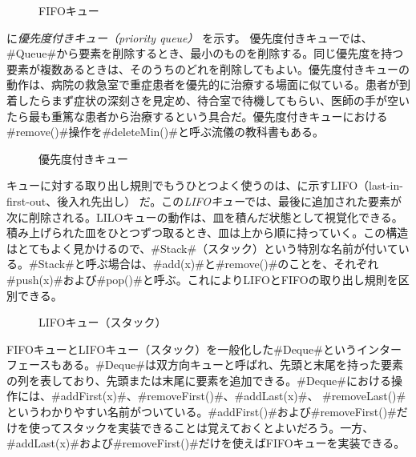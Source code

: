 \begin{figure}
  \caption{FIFOキュー}
\end{figure}

に\emph{優先度付きキュー（priority queue）}%
%
%
%
を示す。
優先度付きキューでは、#Queue#から要素を削除するとき、最小のものを削除する。同じ優先度を持つ要素が複数あるときは、そのうちのどれを削除してもよい。優先度付きキューの動作は、病院の救急室で重症患者を優先的に治療する場面に似ている。患者が到着したらまず症状の深刻さを見定め、待合室で待機してもらい、医師の手が空いたら最も重篤な患者から治療するという具合だ。優先度付きキューにおける#remove()#操作を#deleteMin()#と呼ぶ流儀の教科書もある。 %

\begin{figure}
  \caption{優先度付きキュー}
\end{figure}

キューに対する取り出し規則でもうひとつよく使うのは、に示すLIFO（last-in-first-out、後入れ先出し）
%
%
%
%
だ。この\emph{LIFOキュー}では、最後に追加された要素が次に削除される。LILOキューの動作は、皿を積んだ状態として視覚化できる。積み上げられた皿をひとつずつ取るとき、皿は上から順に持っていく。この構造はとてもよく見かけるので、#Stack#（スタック）という特別な名前が付いている。#Stack#と呼ぶ場合は、#add(x)#と#remove()#のことを、それぞれ#push(x)#および#pop()#と呼ぶ。これによりLIFOとFIFOの取り出し規則を区別できる。

\begin{figure}
  \caption{LIFOキュー（スタック）}
\end{figure}

FIFOキューとLIFOキュー（スタック）を一般化した#Deque#というインターフェースもある。#Deque#は双方向キューと呼ばれ、先頭と末尾を持った要素の列を表しており、先頭または末尾に要素を追加できる。#Deque#における操作には、#addFirst(x)#、#removeFirst()#、#addLast(x)#、 #removeLast()#というわかりやすい名前がついている。#addFirst()#および#removeFirst()#だけを使ってスタックを実装できることは覚えておくとよいだろう。一方、#addLast(x)#および#removeFirst()#だけを使えばFIFOキューを実装できる。 %

